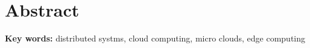 \chapter*{Abstract}
\textbf{Key words:} distributed systms, cloud computing, micro clouds, edge computing
